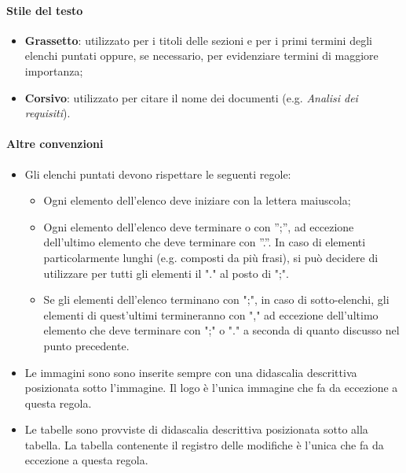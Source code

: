 \paragraph{Stile del testo}
\begin{itemize}
    \item \textbf{Grassetto}: utilizzato per i titoli delle sezioni e per i primi termini degli elenchi puntati oppure, se necessario, per evidenziare termini di maggiore importanza;
    \item \textbf{Corsivo}: utilizzato per citare il nome dei documenti (e.g. \textit{Analisi dei requisiti}).
\end{itemize}

\paragraph{Altre convenzioni}
\begin{itemize}
    \item Gli elenchi puntati devono rispettare le seguenti regole:
        \begin{itemize}
            \item Ogni elemento dell’elenco deve iniziare con la lettera maiuscola;
            \item Ogni elemento dell'elenco deve terminare o con ”;”, ad eccezione dell’ultimo elemento che deve terminare con ”.”. In caso di elementi particolarmente lunghi (e.g. composti da più frasi), si può decidere di utilizzare per tutti gli elementi il "." al posto di ";".
            \item Se gli elementi dell'elenco terminano con ";", in caso di sotto-elenchi, gli elementi di quest'ultimi termineranno con "," ad eccezione dell'ultimo elemento che deve terminare con ";" o "." a seconda di quanto discusso nel punto precedente.
        \end{itemize}
    \item Le immagini sono sono inserite sempre con una didascalia descrittiva posizionata sotto l’immagine. Il logo è l'unica immagine che fa da eccezione a questa regola.
    \item Le tabelle sono provviste di didascalia descrittiva posizionata sotto alla tabella. La tabella contenente il registro delle modifiche è l’unica che fa da eccezione a questa regola.
\end{itemize}


